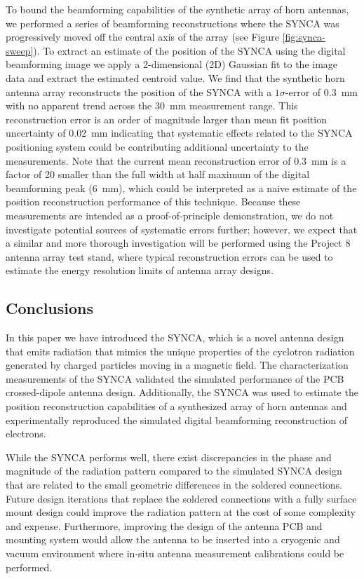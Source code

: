 To bound the beamforming capabilities of the synthetic array of horn antennas, we performed a series of beamforming reconstructions where the SYNCA was progressively moved off the central axis of the array (see Figure \ref{fig:synca-sweep}). To extract an estimate of the position of the SYNCA using the digital beamforming image we apply a 2-dimensional (2D) Gaussian fit to the image data and extract the estimated centroid value. We find that the synthetic horn antenna array reconstructs the position of the SYNCA with a $1\sigma$-error of 0.3~mm with no apparent trend across the 30~mm measurement range. This reconstruction error is an order of magnitude larger than mean fit position uncertainty of 0.02~mm indicating that systematic effects related to the SYNCA positioning system could be contributing additional uncertainty to the measurements. Note that the current mean reconstruction error of 0.3~mm is a factor of 20 smaller than the full width at half maximum of the digital beamforming peak (6~mm), which could be interpreted as a naive estimate of the position reconstruction performance of this technique. Because these measurements are intended as a proof-of-principle demonstration, we do not investigate potential sources of systematic errors further; however, we expect that a similar and more thorough investigation will be performed using the Project 8 antenna array test stand, where typical reconstruction errors can be used to estimate the energy resolution limits of antenna array designs.

\subsection{Conclusions}

In this paper we have introduced the SYNCA, which is a novel antenna design that emits radiation that mimics the unique properties of the cyclotron radiation generated by charged particles moving in a magnetic field. The characterization measurements of the SYNCA validated the simulated performance of the PCB crossed-dipole antenna design. Additionally, the SYNCA was used to estimate the position reconstruction capabilities of a synthesized array of horn antennas and experimentally reproduced the simulated digital beamforming reconstruction of electrons. 

While the SYNCA performs well, there exist discrepancies in the phase and magnitude of the radiation pattern compared to the simulated SYNCA design that are related to the small geometric differences in the soldered connections. Future design iterations that replace the soldered connections with a fully surface mount design could improve the radiation pattern at the cost of some complexity and expense. Furthermore, improving the design of the antenna PCB and mounting system would allow the antenna to be inserted into a cryogenic and vacuum environment where in-situ antenna measurement calibrations could be performed. 

